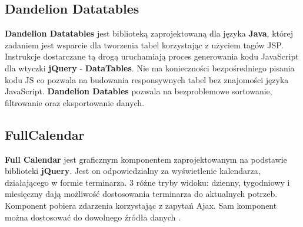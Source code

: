 \subsection{Dandelion Datatables}
\label{tech:dandelion}
	\textbf{Dandelion Datatables} jest biblioteką zaprojektowaną dla języka \textbf{Java}, której zadaniem jest wsparcie dla tworzenia tabel korzystając z użyciem tagów JSP. Instrukcje dostarczane tą drogą uruchamiają proces generowania kodu JavaScript dla wtyczki \textbf{jQuery} - \textbf{DataTables}. Nie ma konieczności bezpośredniego pisania kodu JS co pozwala na budowania responsywnych tabel bez znajomości języka JavaScript. \textbf{Dandelion Datables} pozwala na bezproblemowe sortowanie, filtrowanie oraz eksportowanie danych. 
	
\subsection{FullCalendar}
\label{tech:fullCalendar}
	\textbf{Full Calendar} jest graficznym komponentem zaprojektowanym na podstawie biblioteki \textbf{jQuery}. Jest on odpowiedzialny za wyświetlenie kalendarza, działającego w formie terminarza. 3 różne tryby widoku: dzienny, tygodniowy i miesięczny dają możliwość dostosowania terminarza do aktualnych potrzeb. Komponent pobiera zdarzenia korzystając z zapytań Ajax. Sam komponent można dostosować do dowolnego źródła danych \cite{fullCalendar}.
